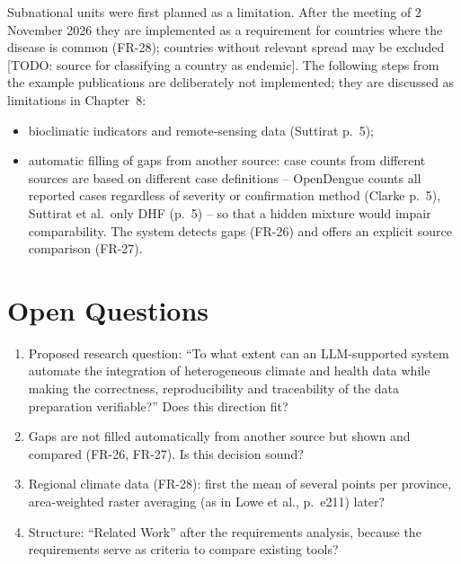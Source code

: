 \documentclass[11pt,a4paper]{article}
\newcommand{\todo}[1]{\textcolor{red!70!black}{[TODO: #1]}}
\begin{document}
Subnational units were first planned as a limitation. After the meeting of
2 November 2026 they are implemented as a requirement for countries where the
disease is common (FR-28); countries without relevant spread may be excluded
\todo{source for classifying a country as endemic}. The following steps from the
example publications are deliberately not implemented; they are discussed as
limitations in Chapter~8:
\begin{itemize}[nosep]
  \item bioclimatic indicators and remote-sensing data (Suttirat p.~5);
  \item automatic filling of gaps from another source: case counts from different
        sources are based on different case definitions -- OpenDengue counts all
        reported cases regardless of severity or confirmation method (Clarke p.~5),
        Suttirat et al.\ only DHF (p.~5) -- so that a hidden mixture would impair
        comparability. The system detects gaps (FR-26) and offers an explicit
        source comparison (FR-27).
\end{itemize}

\section*{Open Questions}\label{sec:questions}
\begin{enumerate}[nosep]
  \item Proposed research question: \enquote{To what extent can an LLM-supported
        system automate the integration of heterogeneous climate and health data
        while making the correctness, reproducibility and traceability of the data
        preparation verifiable?} Does this direction fit?
  \item Gaps are not filled automatically from another source but shown and
        compared (FR-26, FR-27). Is this decision sound?
  \item Regional climate data (FR-28): first the mean of several points per
        province, area-weighted raster averaging (as in Lowe et al., p.~e211) later?
  \item Structure: \enquote{Related Work} after the requirements analysis, because
        the requirements serve as criteria to compare existing tools?
\end{enumerate}
\end{document}
